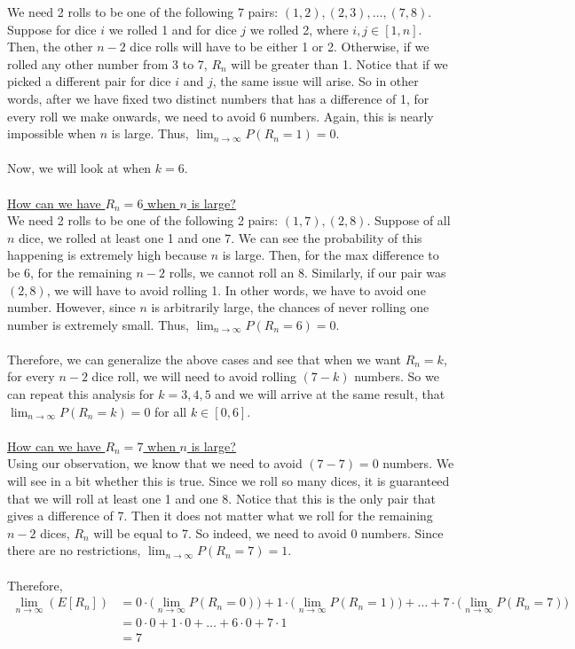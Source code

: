 \documentclass{article}
\begin{document}
We need 2 rolls to be one of the following 7 pairs: $(1,2), (2,3),\dots, (7,8)$. Suppose for dice $i$ we rolled 1 and for dice $j$ we rolled 2, where $i, j\in [1, n]$. Then, the other $n-2$ dice rolls will have to be either 1 or 2. Otherwise, if we rolled any other number from 3 to 7, $R_n$ will be greater than 1. Notice that if we picked a different pair for dice $i$ and $j$, the same issue will arise. So in other words, after we have fixed two distinct numbers that has a difference of 1, for every roll we make onwards, we need to avoid 6 numbers. Again, this is nearly impossible when $n$ is large. Thus, $\lim_{n\to\infty} P(R_n=1)=0$.\\~\\
 Now, we will look at when $k=6$. \\~\\
\underline{How can we have $R_n=6$ when $n$ is large?} \\
We need 2 rolls to be one of the following 2 pairs: $(1,7), (2,8)$. Suppose of all $n$ dice, we rolled at least one 1 and one 7. We can see the probability of this happening is extremely high because $n$ is large. Then, for the max difference to be 6, for the remaining $n-2$ rolls, we cannot roll an 8. Similarly, if our pair was $(2, 8)$, we will have to avoid rolling 1. In other words, we have to avoid one number. However, since $n$ is arbitrarily large, the chances of never rolling one number is extremely small. Thus, $\lim_{n\to\infty} P(R_n=6)=0$. \\~\\
Therefore, we can generalize the above cases and see that when we want $R_n=k$, for every $n-2$ dice roll, we will need to avoid rolling $(7-k)$ numbers. So we can repeat this analysis for $k = 3, 4, 5$ and we will arrive at the same result, that $\lim_{n\to\infty} P(R_n=k)=0$ for all $k\in [0, 6]$.\\~\\
\underline{How can we have $R_n=7$ when $n$ is large?}\\
Using our observation, we know that we need to avoid $(7-7)=0$ numbers. We will see in a bit whether this is true. Since we roll so many dices, it is guaranteed that we will roll at least one 1 and one 8. Notice that this is the only pair that gives a difference of 7. Then it does not matter what we roll for the remaining $n-2$ dices, $R_n$ will be equal to 7. So indeed, we need to avoid 0 numbers. Since there are no restrictions, $\lim_{n\to\infty}P(R_n=7)=1$. 
\\~\\
Therefore, 
\begin{align*}
    \lim_{n\to\infty} (E[R_n])&=0\cdot \bigg(\lim_{n\to\infty} P(R_n=0)\bigg)+1\cdot\bigg(\lim_{n\to\infty} P(R_n=1)\bigg) +\dots+7\cdot \bigg(\lim_{n\to\infty} P(R_n=7)\bigg)\\
    &= 0\cdot 0+1\cdot 0+ \dots+6\cdot 0+7\cdot 1\\
    &= 7
\end{align*}
\end{document}
